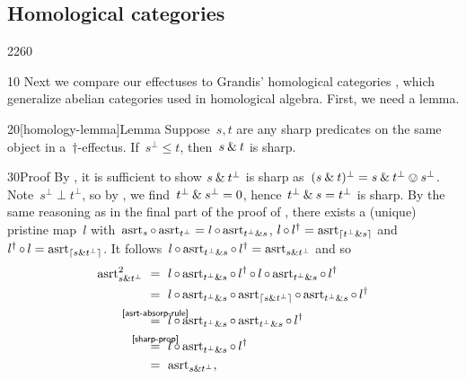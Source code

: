 \subsection{Homological categories}
\begin{parsec}{2260}%
\begin{point}{10}%
Next we compare our effectuses
    to Grandis' homological categories \cite{grandis},
    which generalize abelian categories
    used in homological algebra.
First, we need a lemma.
\end{point}
\begin{point}{20}[homology-lemma]{Lemma}%
Suppose~$s,t$ are any sharp predicates on the same object in a~$\dagger$-effectus.
    If~$s^\perp \leq t$,
    then~$s \mathbin{\&} t$ is sharp.
\begin{point}{30}{Proof}%
By ,
it is sufficient to show
    $s \mathbin{\&} t^\perp$ is sharp
as~$(s \mathbin{\&} t)^\perp = s \mathbin{\&} t^\perp \ovee s^\perp$.
Note~$s^\perp \perp t^\perp$,
so by ,
    we find~$t^\perp \mathbin{\&} s^\perp = 0$,
    hence~$t^\perp \mathbin{\&} s = t^\perp$ is sharp.
By the same reasoning as in the final
    part of the proof of ,
    there exists a (unique) pristine map~$l$
    with~$\mathrm{asrt}_s \mathop{\circ} \mathrm{asrt}_{t^\perp}
        = l\mathop{\circ} \mathrm{asrt}_{t^\perp \mathbin{\&} s}$,
        $l \mathop{\circ} l^\dagger = \mathrm{asrt}_{\left\lceil t^\perp \mathbin{\&} s\right\rceil}$
        and $l^\dagger \mathop{\circ} l = \mathrm{asrt}_{\left\lceil s \mathbin{\&} t^\perp\right\rceil}$.
It follows~$l \mathop{\circ} \mathrm{asrt}_{t^\perp \mathbin{\&} s} \mathop{\circ} l^\dagger
    = \mathrm{asrt}_{s \mathbin{\&} t^\perp}$ and so
\begin{align*}
    \asrt_{\andthen{s}{t^\perp}}^2
    & \ = \ l \after \asrt_{\andthen{t^\perp}{s}} \after
            l^\dagger \after l \after 
            \asrt_{\andthen{t^\perp}{s}} \after l^\dagger \\
    & \ = \ 
    l \after \asrt_{\andthen{t^\perp}{s}} \after
            \asrt_{\ceil{\andthen{s}{t^\perp}}} \after
            \asrt_{\andthen{t^\perp}{s}} \after l^\dagger \\
    & \ \overset{\mathclap{\sref{asrt-absorp-rule}}}{=} \ 
    l \after \asrt_{\andthen{t^\perp}{s}} \after
            \asrt_{\andthen{t^\perp}{s}} \after l^\dagger \\
    & \ \overset{\mathclap{\sref{sharp-prop}}}{=} \ 
    l \after \asrt_{\andthen{t^\perp}{s}} \after
            l^\dagger \\
    & \ = \ 
     \asrt_{\andthen{s}{t^\perp}},
\end{align*}

\end{point}
\end{point}
\end{parsec}
